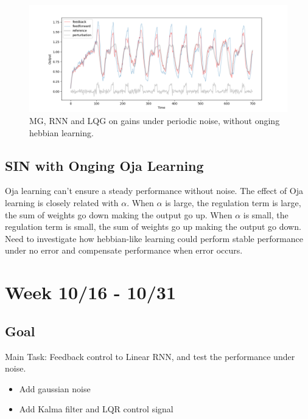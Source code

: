 \documentclass[12pt, a4paper]{article}
\begin{document}
\begin{figure}[H]
    \centering
    \includegraphics[width=\textwidth]{RNN/ourRNN/analysis/fig/1113_MG_lqg.png}
    \caption{MG, RNN and LQG on gains under periodic noise, without onging hebbian learning.}
\end{figure}

\newpage

\subsection*{SIN with Onging Oja Learning}

Oja learning can't ensure a steady performance without noise. The effect of Oja learning is closely related with $\alpha$. When $\alpha$ is large, the regulation term is large, the sum of weights go down making the output go up. When $\alpha$ is small, the regulation term is small, the sum of weights go up making the output go down. Need to investigate how hebbian-like learning could perform stable performance under no error and compensate performance when error occurs.

\newpage


\section*{Week 10/16 - 10/31}

\subsection*{Goal}

\noindent
Main Task: Feedback control to Linear RNN, and test the performance under noise.

\begin{itemize}
    \item Add gaussian noise
    \item Add Kalma filter and LQR control signal
\end{itemize}
\end{document}
